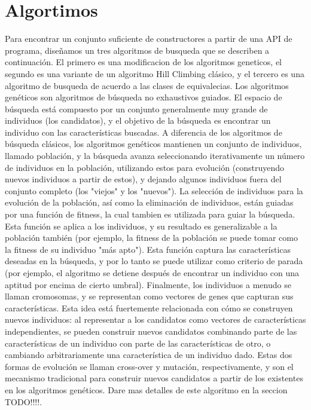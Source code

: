 \section{Algortimos}
Para encontrar un conjunto suficiente de constructores a partir de una API de programa, diseñamos un tres algoritmos de busqueda que se describen a continuación. El primero es una modificacion de los algoritmos geneticos, el segundo es una variante de un algoritmo Hill Climbing clásico, y el tercero es una algoritmo de busqueda de acuerdo a las clases de equivalecias. 
Los algoritmos genéticos \cite{Goldberg:1989} son algoritmos de búsqueda no exhaustivos guiados. \cite{Michalewicz:1996}
El espacio de búsqueda está compuesto por un conjunto generalmente muy grande de individuos (los candidatos), y el objetivo de la búsqueda es encontrar un individuo con las características buscadas. A diferencia de los algoritmos de búsqueda clásicos, los algoritmos genéticos mantienen un conjunto de individuos, llamado población, y la búsqueda avanza seleccionando iterativamente un número de individuos en la población, utilizando estos para evolución (construyendo nuevos individuos a partir de estos), y dejando algunos individuos fuera del conjunto completo (los "viejos" y los "nuevos"). La selección de individuos para la evolución de la población, así como la eliminación de individuos, están guiadas por una función de fitness, la cual tambien es utilizada para guiar la búsqueda. Esta función se aplica a los individuos, y su resultado es generalizable a la población también (por ejemplo, la fitness de la población se puede tomar como la fitness de su individuo "más apto"). Esta función captura las características deseadas en la búsqueda, y por lo tanto se puede utilizar como criterio de parada (por ejemplo, el algoritmo se detiene después de encontrar un individuo con una aptitud por encima de cierto umbral). Finalmente, los individuos a menudo se llaman cromosomas, y se representan como vectores de genes que capturan sus características. Esta idea está fuertemente relacionada con cómo se construyen nuevos individuos: al representar a los candidatos como vectores de características independientes, se pueden construir nuevos candidatos combinando parte de las características de un individuo con parte de las características de otro, o cambiando arbitrariamente una característica de un individuo dado. Estas dos formas de evolución se llaman cross-over y mutación, respectivamente, y son el mecanismo tradicional para construir nuevos candidatos a partir de los existentes en los algoritmos genéticos. Dare mas detalles de este algoritmo en la seccion {TODO!!!!}.

